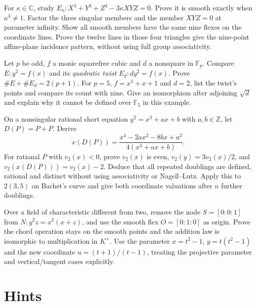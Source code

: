 \begin{exercise}[$\star\star\star$]\label{ex:v9-hesse-pencil}
For $\kappa\in\mathbb C$, study $E_\kappa:X^3+Y^3+Z^3-3\kappa XYZ=0$. Prove it is smooth exactly when $\kappa^3\ne1$. Factor the three singular members and the member $XYZ=0$ at parameter infinity. Show all smooth members have the same nine flexes on the coordinate lines. Prove the twelve lines in those four triangles give the nine-point affine-plane incidence pattern, without using full group associativity.
\end{exercise}
\begin{exercise}[$\star\star$]\label{ex:v9-quadratic-twist-count}
Let $p$ be odd, $f$ a monic squarefree cubic and $d$ a nonsquare in $\mathbb F_p$. Compare $E:y^2=f(x)$ and its \emph{quadratic twist} $E_d:dy^2=f(x)$. Prove $\#E+\#E_d=2(p+1)$. For $p=5$, $f=x^3+x+1$ and $d=2$, list the twist's points and compare its count with nine. Give an isomorphism after adjoining $\sqrt d$ and explain why it cannot be defined over $\mathbb F_5$ in this example.
\end{exercise}
\begin{exercise}[$\star\star$]\label{ex:v9-denominator-doubling}
On a nonsingular rational short equation $y^2=x^3+ax+b$ with $a,b\in\mathbb Z$, let $D(P)=P+P$. Derive
\[
x(D(P))=\frac{x^4-2ax^2-8bx+a^2}{4(x^3+ax+b)}.
\]
For rational $P$ with $v_2(x)<0$, prove $v_2(x)$ is even, $v_2(y)=3v_2(x)/2$, and $v_2(x(D(P)))=v_2(x)-2$. Deduce that all repeated doublings are defined, rational and distinct without using associativity or Nagell--Lutz. Apply this to $2(3,5)$ on Bachet's curve and give both coordinate valuations after $n$ further doublings.
\end{exercise}
\begin{exercise}[$\star\star\star$]\label{ex:v9-nodal-multiplication}
Over a field of characteristic different from two, remove the node $S=[0:0:1]$ from $N:y^2z=x^2(x+z)$, and use the smooth flex $O=[0:1:0]$ as origin. Prove the chord operation stays on the smooth points and the addition law is isomorphic to multiplication in $K^\times$. Use the parameter $x=t^2-1$, $y=t(t^2-1)$ and the new coordinate $u=(t+1)/(t-1)$, treating the projective parameter and vertical/tangent cases explicitly.
\end{exercise}

\section{Hints}

